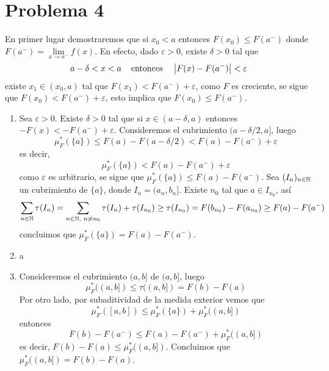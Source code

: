 \documentclass{article}
\begin{document}
\section*{Problema 4}
\noindent En primer lugar demostraremos que si $x_{0}<a$ entonces $F(x_{0})\leq F(a^{-})$ donde 
$F(a^{-})=\lim\limits_{x\to a^{-}}f(x)$. En efecto, dado $\varepsilon>0$, existe $\delta>0$ tal que
\begin{equation*}
    a-\delta<x<a\hspace{4mm}\text{entonces}\hspace{4mm}\left|F(x)-F(a^{-}) \right|<\varepsilon
\end{equation*}
existe $x_{1}\in(x_{0},a)$ tal que $F(x_{1})<F(a^{-})+\varepsilon$, como $F$ es creciente, 
se sigue que $F(x_{0})<F(a^{-})+\varepsilon$, esto implica que $F(x_{0})\leq F(a^{-})$.
\begin{enumerate}
    \item Sea $\varepsilon>0$. Existe $\delta>0$ tal que si $x\in(a-\delta,a)$ entonces 
    $-F(x)<-F(a^{-})+\varepsilon$. Consideremos el cubrimiento $(a-\delta/2,a]$, luego
    \begin{equation*}
        \mu_{F}^{*}(\{a\})\leq F(a)-F(a-\delta/2)<F(a)-F(a^{-})+\varepsilon
    \end{equation*}
    es decir,
    \begin{equation*}
        \mu_{F}^{*}(\{a\})<F(a)-F(a^{-})+\varepsilon
    \end{equation*}
    como $\varepsilon$ es arbitrario, se sigue que $\mu_{F}^{*}(\{a\})\leq F(a)-F(a^{-})$. Sea
    $(I_{n})_{n\in\mathbb{N}}$ un cubrimiento de $\{a\}$, donde $I_{n}=(a_{n},b_{n}]$. Existe $n_{0}$ 
    tal que $a\in I_{n_{0}}$, así
    \begin{equation*}
        \sum_{n\in\mathbb{N}}\tau(I_{n})=\sum_{n\in\mathbb{N},\hspace{1mm}n\neq n_{0}}\tau(I_{n})+\tau(I_{n_{0}})
        \geq\tau(I_{n_{0}})=F(b_{n_{0}})-F(a_{n_{0}})\geq F(a)-F(a^{-})
    \end{equation*}
    concluimos que $\mu_{F}^{*}(\{a\})=F(a)-F(a^{-})$.

    \item a
    
    \item Consideremos el cubrimiento $(a,b]$ de $(a,b]$, luego
    \begin{equation*}
        \mu_{F}^{*}((a,b])\leq\tau((a,b])=F(b)-F(a)
    \end{equation*}
    Por otro lado, por subaditividad de la medida exterior vemos que
    \begin{equation*}
        \mu_{F}^{*}([a,b])\leq\mu_{F}^{*}(\{a\})+\mu_{F}^{*}((a,b])
    \end{equation*}
    entonces
    \begin{equation*}
        F(b)-F(a^{-})\leq F(a)-F(a^{-})+\mu_{F}^{*}((a,b])
    \end{equation*}
    es decir, $F(b)-F(a)\leq\mu_{F}^{*}((a,b])$. Concluimos que $\mu_{F}^{*}((a,b])=F(b)-F(a)$.
\end{enumerate}

\end{document}
